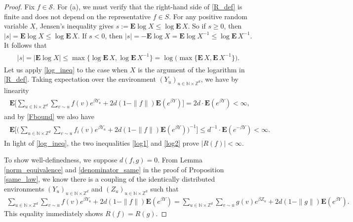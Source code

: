 \documentclass[11pt,reqno]{amsart}
\numberwithin{equation}{section}
\theoremstyle{definition}
\begin{document}
\begin{proof}
Fix $f \in {\mathcal{S}}$.
For (a), we must verify that the right-hand side of \eqref{R_def} is finite and does not depend on the representative $f \in S$.
For any positive random variable $X$, Jensen's inequality gives
$s := {\mathbf{E}} \log X \leq \log {\mathbf{E}}\, X$.
So if $s \ge 0$, then
$|s| = {\mathbf{E}} \log X \leq \log {\mathbf{E}}\, X$.
If $s < 0$, then
$|s| = -{\mathbf{E}} \log X = {\mathbf{E}} \log X^{-1} \leq \log {\mathbf{E}}\, X^{-1}$.
It follows that
{\begin{align} \begin{split} {
|s| = |{\mathbf{E}} \log X| \leq \max\{\log {\mathbf{E}}\, X,\log {\mathbf{E}}\, X^{-1}\} 
= \log\big(\max\{{\mathbf{E}}\, X,{\mathbf{E}}\, X^{-1}\}\big). \label{log_ineq}
} \end{split} \end{align}}
Let us apply \eqref{log_ineq} to the case when $X$ is the argument of the logarithm in \eqref{R_def}.
Taking expectation over the environment $(Y_u)_{u \in {\mathbb{N}} \times {\mathbb{Z}}^d}$, we have by linearity
{\begin{align} \begin{split} {
 {\mathbf{E}} \Bigg[\sum_{u \in {\mathbb{N}} \times {\mathbb{Z}}^d} \sum_{v \sim u} f(v)e^{\beta Y_u} + 2d(1 - \|f\|){\mathbf{E}}(e^{\beta Y})\Bigg]
 = 2d\cdot {\mathbf{E}}(e^{\beta Y}) < \infty, \label{log1}
} \end{split} \end{align}}
and by \eqref{Fbound} we also have
{\begin{align} \begin{split} {
 {\mathbf{E}} \Bigg[\bigg(\sum_{u \in {\mathbb{N}} \times {\mathbb{Z}}^d} \sum_{v \sim u} f_i(v)e^{\beta Y_u} + 2d(1 - \|f\|){\mathbf{E}}(e^{\beta Y})\bigg)^{-1} \Bigg] \leq d^{-1} \cdot {\mathbf{E}}(e^{-\beta Y}) < \infty. \label{log2}
 } \end{split} \end{align}}
In light of \eqref{log_ineq}, the two inequalities \eqref{log1} and \eqref{log2} prove $|R(f)| < \infty$.
   
To show well-definedness, we suppose $d(f,g) = 0$.
From Lemma \ref{norm_equivalence} and \eqref{denominator_same} in the proof of Proposition \ref{same_law}, we know there is a coupling of the identically distributed environments $(Y_u)_{u \in {\mathbb{N}} \times {\mathbb{Z}}^d}$ and $(Z_u)_{u \in {\mathbb{N}} \times {\mathbb{Z}}^d}$ such that
{\begin{align*} {
\sum_{u \in {\mathbb{N}} \times {\mathbb{Z}}^d} \sum_{v \sim u} f(v)e^{\beta Y_u} + 2d(1-\|f\|){\mathbf{E}}(e^{\beta Y})
= \sum_{u \in {\mathbb{N}} \times {\mathbb{Z}}^d} \sum_{v \sim u} g(v)e^{\beta Z_u} + 2d(1-\|g\|){\mathbf{E}}(e^{\beta Y}).
} \end{align*}}
This equality immediately shows $R(f) = R(g)$.


\end{proof}
\end{document}
